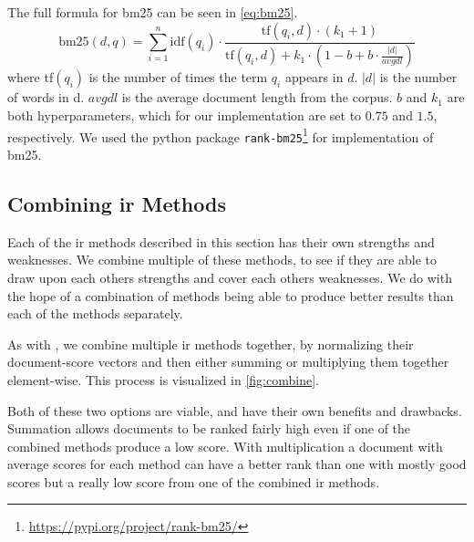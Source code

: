 The full formula for \gls{bm25} can be seen in \autoref{eq:bm25}\cite{bm25}.
\begin{equation}\label{eq:bm25}
	\text{bm25}(d, q) = \sum_{i=1}^{n}\text{idf}(q_i) \cdot \frac{\text{tf}(q_i, d) \cdot (k_1 + 1)}{\text{tf}(q_i, d) + k_1 \cdot (1 - b + b \cdot \frac{|d|}{avgdl})}
\end{equation}
where tf$(q_i)$ is the number of times the term $q_i$ appears in $d$.
$|d|$ is the number of words in d. 
$avgdl$ is the average document length from the corpus.
$b$ and $k_1$ are both hyperparameters, which for our implementation are set to $0.75$ and $1.5$, respectively.
We used the python package \texttt{rank-bm25}\footnote{\url{https://pypi.org/project/rank-bm25/}} for implementation of \gls{bm25}.


\subsection{Combining \gls{ir} Methods}
Each of the \gls{ir} methods described in this section has their own strengths and weaknesses.
We combine multiple of these methods, to see if they are able to draw upon each others strengths and cover each others weaknesses.
We do with the hope of a combination of methods being able to produce better results than each of the methods separately.

As with \citet{yang2009topic}, we combine multiple \gls{ir} methods together, by normalizing their document-score vectors and then either summing or multiplying them together element-wise.
This process is visualized in \ref{fig:combine}.



Both of these two options are viable, and have their own benefits and drawbacks.
Summation allows documents to be ranked fairly high even if one of the combined methods produce a low score.
With multiplication a document with average scores for each method can have a better rank than one with mostly good scores but a really low score from one of the combined \gls{ir} methods.
